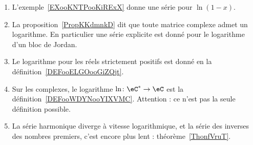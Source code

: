 \begin{enumerate}
    \item
        L'exemple~\ref{EXooKNTPooKiRExX} donne une série pour \( \ln(1-x)\).
    \item
        La proposition~\ref{PropKKdmnkD} dit que toute matrice complexe admet un logarithme. En particulier une série explicite est donné pour le logarithme d'un bloc de Jordan.
    \item
        Le logarithme pour les réels strictement positifs est donné en la définition~\ref{DEFooELGOooGiZQjt}.
    \item
        Sur les complexes, le logarithme \( \ln \colon \eC^*\to \eC\) est la définition~\ref{DEFooWDYNooYIXVMC}. Attention : ce n'est pas la seule définition possible.
    \item
        La série harmonique diverge à vitesse logarithmique, et la série des inverses des nombres premiers, c'est encore plus lent : théorème~\ref{ThonfVruT}.
\end{enumerate}
